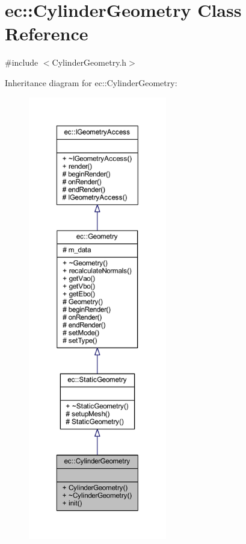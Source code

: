 \hypertarget{classec_1_1_cylinder_geometry}{}\section{ec\+:\+:Cylinder\+Geometry Class Reference}
\label{classec_1_1_cylinder_geometry}


{\ttfamily \#include $<$Cylinder\+Geometry.\+h$>$}



Inheritance diagram for ec\+:\+:Cylinder\+Geometry\+:\nopagebreak
\begin{figure}[H]
\begin{center}
\leavevmode
\includegraphics[height=550pt]{classec_1_1_cylinder_geometry__inherit__graph}
\end{center}
\end{figure}


